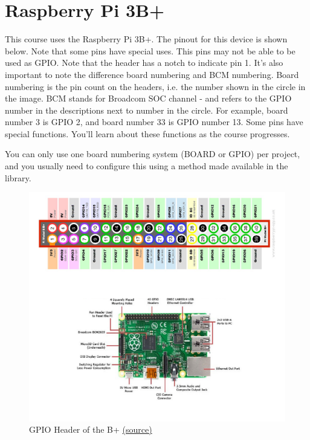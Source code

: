 \section{Raspberry Pi 3B+}
This course uses the Raspberry Pi 3B+. The pinout for this device is shown below. Note that some pins have special uses. This pins may not be able to be used as GPIO. Note that the header has a notch to indicate pin 1. It's also important to note the difference board numbering and BCM numbering. Board numbering is the pin count on the headers, i.e. the number shown in the circle in the image. BCM stands for Broadcom SOC channel - and refers to the GPIO number in the descriptions next to number in the circle. For example, board number 3 is GPIO 2, and board number 33 is GPIO number 13. Some pins have special functions. You'll learn about these functions as the course progresses. 

You can only use one board numbering system (BOARD or GPIO) per project, and you usually need to configure this using a method made available in the library.

\begin{figure}[H]
\centering
\includegraphics[width=\columnwidth]{Figures/pinout}
\caption{GPIO Header of the B+ \href{https://www.jameco.com/Jameco/workshop/circuitnotes/raspberry-pi-circuit-note.html}{(source)}}
\label{fig:pinout}
\end{figure}

